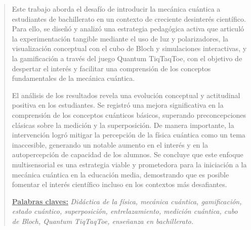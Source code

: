 \documentclass[10pt,a4paper]{article}
\begin{document}
	\begin{abstract}
\noindent Este trabajo aborda el desafío de introducir la mecánica cuántica a estudiantes de bachillerato en un contexto de creciente desinterés científico. Para ello, se diseñó y analizó una estrategia pedagógica activa que articuló la experimentación tangible mediante el uso de luz y polarizadores, la visualización conceptual con el cubo de Bloch y simulaciones interactivas, y la gamificación a través del juego Quantum TiqTaqToe, con el objetivo de despertar el interés y facilitar una comprensión de los conceptos fundamentales de la mecánica cuántica.

\noindent El análisis de los resultados revela una evolución conceptual y actitudinal positiva en los estudiantes. Se registró una mejora significativa en la comprensión de los conceptos cuánticos básicos, superando preconcepciones clásicas sobre la medición y la superposición. De manera importante, la intervención logró mitigar la percepción de la física cuántica como un tema inaccesible, generando un notable aumento en el interés y en la autopercepción de capacidad de los alumnos. Se concluye que este enfoque multisensorial es una estrategia viable y prometedora para la iniciación a la mecánica cuántica en la educación media, demostrando que es posible fomentar el interés científico incluso en los contextos más desafiantes.


		\vspace{2mm}\par \noindent
		\underline{\textbf{Palabras claves:}} \hspace{1mm} \textit{Didáctica de la física, mecánica cuántica, gamificación, estado cuántico, superposición, entrelazamiento, medición cuántica, cubo de Bloch, Quantum TiqTaqToe, enseñanza en bachillerato.}
	\end{abstract}
	
\end{document}
